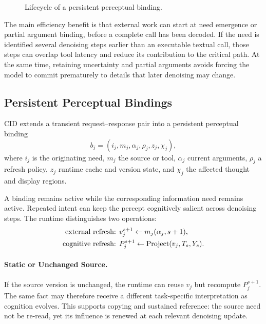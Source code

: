 \begin{figure}[t]
  \centering
  
  \caption{Lifecycle of a persistent perceptual binding.}
  \label{fig:binding-lifecycle}
\end{figure}

The main efficiency benefit is that external work can start at need emergence or partial argument binding, before a complete call has been decoded. If the need is identified several denoising steps earlier than an executable textual call, those steps can overlap tool latency and reduce its contribution to the critical path. At the same time, retaining uncertainty and partial arguments avoids forcing the model to commit prematurely to details that later denoising may change.

\subsection{Persistent Perceptual Bindings}
\label{sec:bindings}

CID extends a transient request--response pair into a persistent perceptual binding
\begin{equation}
  b_j = (i_j, m_j, \alpha_j, \rho_j, z_j, \chi_j),
  \label{eq:binding}
\end{equation}
where $i_j$ is the originating need, $m_j$ the source or tool, $\alpha_j$ current arguments, $\rho_j$ a refresh policy, $z_j$ runtime cache and version state, and $\chi_j$ the affected thought and display regions.

A binding remains active while the corresponding information need remains active. Repeated intent can keep the percept cognitively salient across denoising steps. The runtime distinguishes two operations:
\begin{align}
  \text{external refresh: }& v_j^{s+1} \leftarrow m_j(\alpha_j, s+1), \\
  \text{cognitive refresh: }& P_j^{s+1} \leftarrow \operatorname{Project}(v_j, T_s, Y_s).
  \label{eq:two-refreshes}
\end{align}

\paragraph{Static or Unchanged Source.}
If the source version is unchanged, the runtime can reuse $v_j$ but recompute $P_j^{s+1}$. The same fact may therefore receive a different task-specific interpretation as cognition evolves. This supports copying and sustained reference: the source need not be re-read, yet its influence is renewed at each relevant denoising update.

